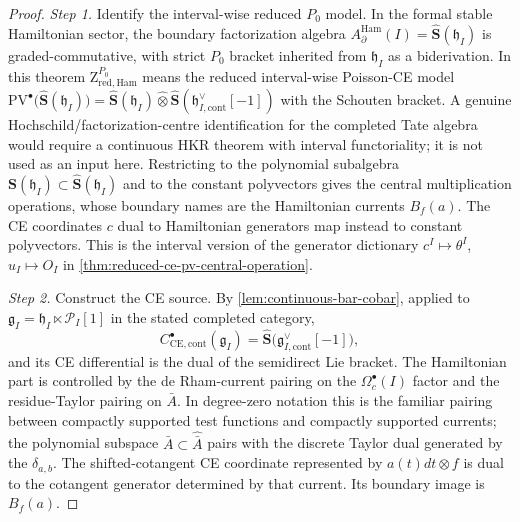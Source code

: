 \documentclass[11pt]{memoir}
\begin{document}
\begin{proof}
  \emph{Step 1.} Identify the interval-wise reduced \(P_0\) model. In
  the formal stable Hamiltonian sector, the boundary factorization algebra
  $A_\partial^{\mathrm{Ham}}(I)=\widehat{\mathbf S}(\mathfrak h_I)$
  is graded-commutative, with strict $P_0$ bracket inherited from
  $\mathfrak h_I$ as a biderivation.  In this theorem
  \(\mathrm Z^{P_0}_{\mathrm{red,Ham}}\) means the reduced
  interval-wise Poisson-CE model
  $\mathrm{PV}^\bullet\bigl(\widehat{\mathbf S}(\mathfrak h_I)\bigr)
  =\widehat{\mathbf S}(\mathfrak h_I)\widehat\otimes
	    \widehat{\mathbf S}(\mathfrak h^{\vee}_{I,\mathrm{cont}}[-1])$
  with the Schouten bracket.  A genuine Hochschild/factorization-centre
  identification for the completed Tate algebra would require a
  continuous HKR theorem with interval functoriality; it is not used as
  an input here. Restricting to the
  polynomial subalgebra
  $\mathbf S(\mathfrak h_I)\subset\widehat{\mathbf S}(\mathfrak h_I)$
  and to the constant polyvectors gives the central multiplication
  operations, whose boundary names are the Hamiltonian currents
  \(B_f(a)\). The CE coordinates \(c\) dual to
  Hamiltonian generators map instead to constant polyvectors. This is
  the interval version of the generator dictionary
  $c^I\mapsto\theta^I$, $u_I\mapsto O_I$ in
  \ref{thm:reduced-ce-pv-central-operation}.

  \emph{Step 2.} Construct the CE source. By
  \ref{lem:continuous-bar-cobar}, applied to
  $\mathfrak g_I=\mathfrak h_I\ltimes\mathcal P_I[1]$ in the stated
  completed category,
  $$C^\bullet_{\mathrm{CE},\mathrm{cont}}(\mathfrak g_I)
   =\widehat{\mathbf S}\bigl(\mathfrak g^{\vee}_{I,\mathrm{cont}}[-1]\bigr),$$
  and its CE differential is the dual of the semidirect Lie bracket.
  The Hamiltonian part is controlled by the de Rham-current pairing on
  the $\Omega_c^\bullet(I)$ factor and the residue-Taylor pairing on
  $\bar A$. In degree-zero notation this is the familiar pairing between
  compactly supported test functions and compactly supported currents;
  the polynomial subspace $\bar A\subset\widehat{\bar A}$ pairs with the
  discrete Taylor dual generated by the $\delta_{a,b}$. The
  shifted-cotangent CE coordinate represented by \(a(t)dt\otimes f\)
  is dual to the cotangent generator determined by that current. Its
  boundary image is \(B_f(a)\).


\end{proof}
\end{document}
